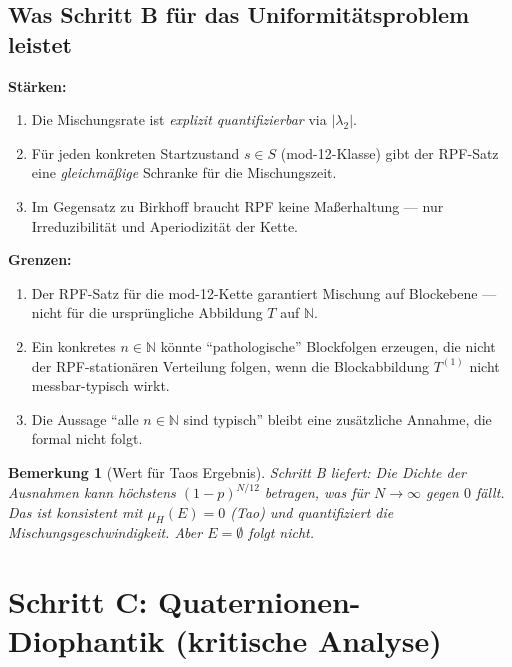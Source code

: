 \documentclass[12pt,a4paper]{article}
\newtheorem{bemerkung}[definition]{Bemerkung}
\newcommand{\N}{\mathbb{N}}
\begin{document}
\subsection{Was Schritt B für das Uniformitätsproblem leistet}

\begin{tcolorbox}[kernidee, title={Schritt B: Stärken und Grenzen}]
\textbf{Stärken:}
\begin{enumerate}[label=(\arabic*), nosep]
  \item Die Mischungsrate ist \emph{explizit quantifizierbar} via $|\lambda_2|$.
  \item Für jeden konkreten Startzustand $s \in S$ (mod-12-Klasse) gibt
    der RPF-Satz eine \emph{gleichmäßige} Schranke für die Mischungszeit.
  \item Im Gegensatz zu Birkhoff braucht RPF keine Maßerhaltung ---
    nur Irreduzibilität und Aperiodizität der Kette.
\end{enumerate}
\textbf{Grenzen:}
\begin{enumerate}[label=(\arabic*), nosep]
  \item Der RPF-Satz für die mod-12-Kette garantiert Mischung
    auf Blockebene --- nicht für die ursprüngliche Abbildung $T$ auf $\N$.
  \item Ein konkretes $n \in \N$ könnte ``pathologische'' Blockfolgen
    erzeugen, die nicht der RPF-stationären Verteilung folgen, wenn
    die Blockabbildung $T^{(1)}$ nicht messbar-typisch wirkt.
  \item Die Aussage ``alle $n \in \N$ sind typisch'' bleibt eine
    zusätzliche Annahme, die formal nicht folgt.
\end{enumerate}
\end{tcolorbox}

\begin{bemerkung}[Wert für Taos Ergebnis]
Schritt B liefert: Die Dichte der Ausnahmen kann höchstens $(1-p)^{N/12}$
betragen, was für $N \to \infty$ gegen $0$ fällt. Das ist konsistent
mit $\mu_H(E) = 0$ (Tao) und quantifiziert die Mischungsgeschwindigkeit.
Aber $E = \emptyset$ folgt nicht.
\end{bemerkung}

\section{Schritt C: Quaternionen-Diophantik (kritische Analyse)}
\label{sec:schrittC}
\end{document}

